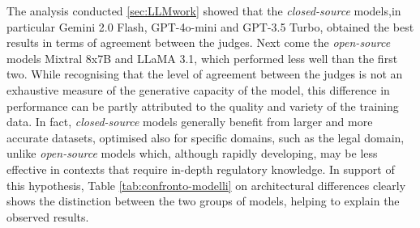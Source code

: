 The analysis conducted \ref{sec:LLMwork} showed that the \textit{closed-source} models,in particular Gemini 2.0 Flash, GPT-4o-mini and GPT-3.5 Turbo, obtained the best results in terms of agreement between the judges. Next come the \textit{open-source}  models Mixtral 8x7B and LLaMA 3.1, which performed less well than the first two.
While recognising that the level of agreement between the judges is not an exhaustive measure of the generative capacity of the model, this difference in performance can be partly attributed to the quality and variety of the training data.
In fact, \textit{closed-source} models generally benefit from larger and more accurate datasets, optimised also for specific domains, such as the legal domain, unlike \textit{open-source} models which, although rapidly developing, may be less effective in contexts that require in-depth regulatory knowledge.
In support of this hypothesis, Table \ref{tab:confronto-modelli} on architectural differences clearly shows the distinction between the two groups of models, helping to explain the observed results.